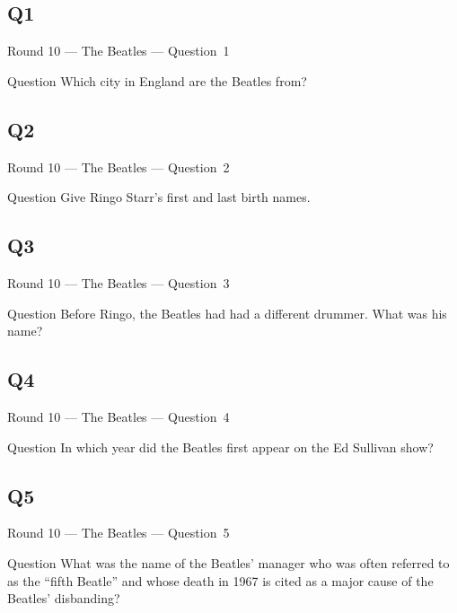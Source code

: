 \documentclass[11pt]{beamer}
\begin{document}
\subsection*{Q1}
\begin{frame}[t]{Round 10 --- The Beatles --- \mbox{Question 1}}
\vspace{-0.5em}
\begin{block}{Question}
Which city in England are the Beatles from?
\end{block}
\end{frame}
\subsection*{Q2}
\begin{frame}[t]{Round 10 --- The Beatles --- \mbox{Question 2}}
\vspace{-0.5em}
\begin{block}{Question}
Give Ringo Starr's first  and last birth names.
\end{block}
\end{frame}
\subsection*{Q3}
\begin{frame}[t]{Round 10 --- The Beatles --- \mbox{Question 3}}
\vspace{-0.5em}
\begin{block}{Question}
Before Ringo, the Beatles had had a different drummer. What was his name?
\end{block}
\end{frame}
\subsection*{Q4}
\begin{frame}[t]{Round 10 --- The Beatles --- \mbox{Question 4}}
\vspace{-0.5em}
\begin{block}{Question}
In which year did the Beatles first appear on the Ed Sullivan show?
\end{block}
\end{frame}
\subsection*{Q5}
\begin{frame}[t]{Round 10 --- The Beatles --- \mbox{Question 5}}
\vspace{-0.5em}
\begin{block}{Question}
What was the name of the Beatles' manager who was often referred to as the ``fifth Beatle'' and whose death in 1967 is cited as a major cause of the Beatles' disbanding?
\end{block}
\end{frame}
\end{document}
